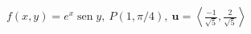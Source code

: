 \item $f(x, y) = e^x \operatorname{sen} y, \ P(1, \pi/4), \ \mathbf{u} = \left\langle \frac{-1}{\sqrt{5}}, \frac{2}{\sqrt{5}} \right\rangle$

